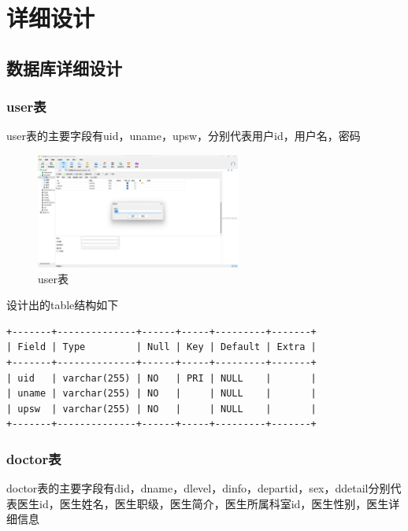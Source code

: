 \documentclass[UTF8,12pt]{article}
\begin{document}
\newpage

\section{详细设计}

\subsection{数据库详细设计}

\subsubsection{user表}
user表的主要字段有uid，uname，upsw，分别代表用户id，用户名，密码

\newpage

\begin{figure}[htbp]
    \centering
    \includegraphics[width=0.6\textwidth]{imgs/5.png}
    \caption{user表}
\end{figure}

设计出的table结构如下

\begin{lstlisting}[frame=shadowbox]
+-------+--------------+------+-----+---------+-------+
| Field | Type         | Null | Key | Default | Extra |
+-------+--------------+------+-----+---------+-------+
| uid   | varchar(255) | NO   | PRI | NULL    |       |
| uname | varchar(255) | NO   |     | NULL    |       |
| upsw  | varchar(255) | NO   |     | NULL    |       |
+-------+--------------+------+-----+---------+-------+
\end{lstlisting}

\subsubsection{doctor表}

doctor表的主要字段有did，dname，dlevel，dinfo，departid，sex，ddetail分别代表医生id，医生姓名，医生职级，医生简介，医生所属科室id，医生性别，医生详细信息

\newpage
\end{document}
